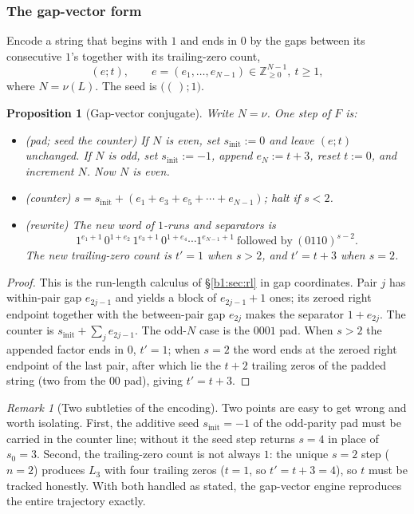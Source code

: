 \documentclass[a4paper]{article}
\theoremstyle{plain}
\newtheorem{proposition}{Proposition}[subsection]
\theoremstyle{definition}
\theoremstyle{remark}
\newtheorem{remark}{Remark}[subsection]
\begin{document}
\subsubsection{The gap-vector form}\label{b1:sec:10.3}
Encode a string that begins with $1$ and ends in $0$ by the gaps between its consecutive $1$'s together with its trailing-zero count,
\[ (e;t),\qquad e=(e_1,\dots,e_{N-1})\in\mathbb Z_{\ge 0}^{N-1},\ t\ge 1, \]
where $N=\nu(L)$. The seed is $\bigl((\,);1\bigr)$.

\begin{proposition}[Gap-vector conjugate]\label{b1:prop:gap}
Write $N=\nu$. One step of $F$ is:
\begin{itemize}
\item (\emph{pad; seed the counter}) If $N$ is even, set $s_{\mathrm{init}}:=0$ and leave $(e;t)$ unchanged. If $N$ is odd, set $s_{\mathrm{init}}:=-1$, append $e_N:=t+3$, reset $t:=0$, and increment $N$. Now $N$ is even.
\item (\emph{counter}) $s=s_{\mathrm{init}}+(e_1+e_3+e_5+\cdots+e_{N-1})$; halt if $s<2$.
\item (\emph{rewrite}) The new word of $1$-runs and separators is
\[ 1^{e_1+1}\,0^{1+e_2}\,1^{e_3+1}\,0^{1+e_4}\cdots 1^{e_{N-1}+1}\ \text{followed by}\ (0110)^{s-2}. \]
The new trailing-zero count is $t'=1$ when $s>2$, and $t'=t+3$ when $s=2$.
\end{itemize}
\end{proposition}
\begin{proof}
This is the run-length calculus of \S\ref{b1:sec:rl} in gap coordinates. Pair $j$ has within-pair gap $e_{2j-1}$ and yields a block of $e_{2j-1}+1$ ones; its zeroed right endpoint together with the between-pair gap $e_{2j}$ makes the separator $1+e_{2j}$. The counter is $s_{\mathrm{init}}+\sum_j e_{2j-1}$. The odd-$N$ case is the $0001$ pad. When $s>2$ the appended factor ends in $0$, $t'=1$; when $s=2$ the word ends at the zeroed right endpoint of the last pair, after which lie the $t+2$ trailing zeros of the padded string (two from the $00$ pad), giving $t'=t+3$.
\end{proof}

\begin{remark}[Two subtleties of the encoding]\label{b1:rem:enc-subtleties}
Two points are easy to get wrong and worth isolating. First, the additive seed $s_{\mathrm{init}}=-1$ of the odd-parity pad must be carried in the counter line; without it the seed step returns $s=4$ in place of $s_0=3$. Second, the trailing-zero count is not always $1$: the unique $s=2$ step ($n=2$) produces $L_3$ with four trailing zeros ($t=1$, so $t'=t+3=4$), so $t$ must be tracked honestly. With both handled as stated, the gap-vector engine reproduces the entire trajectory exactly.
\end{remark}
\end{document}
